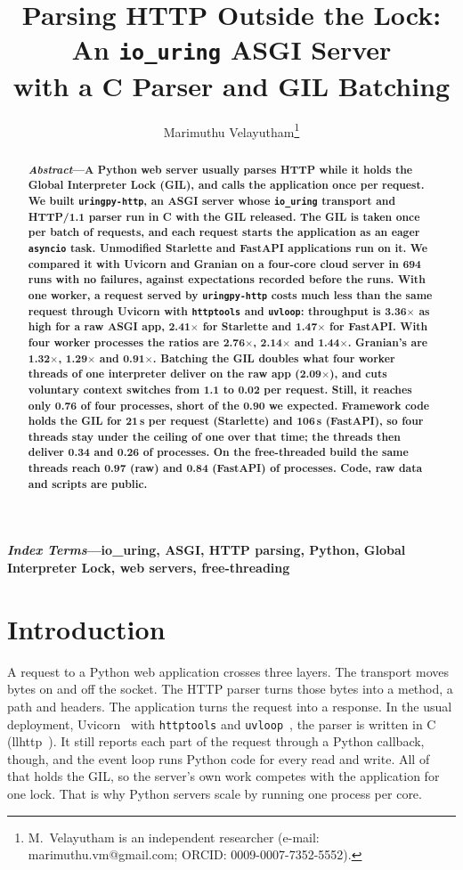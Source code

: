 \documentclass[10pt,twocolumn,letterpaper]{article}
\title{\LARGE Parsing HTTP Outside the Lock: An \texttt{io\_uring} ASGI Server\\ with a C Parser and GIL Batching}
\author{Marimuthu Velayutham\thanks{M.~Velayutham is an independent researcher
(e-mail: marimuthu.vm@gmail.com; ORCID: 0009-0007-7352-5552).}}
\date{}
\newcommand{\code}[1]{\texttt{#1}}
\newcommand{\kx}{$\times$}
\begin{document}
\maketitle

\begin{abstract}
\noindent\textbf{\textit{Abstract}---A Python web server usually parses
HTTP while it holds the Global Interpreter Lock (GIL), and calls the
application once per request. We built \code{uringpy-http}, an ASGI server
whose \code{io\_uring} transport and HTTP/1.1 parser run in C with the GIL
released. The GIL is taken once per batch of requests, and each request
starts the application as an eager \code{asyncio} task. Unmodified Starlette
and FastAPI applications run on it. We compared it with Uvicorn and Granian
on a four-core cloud server in 694 runs with no failures, against
expectations recorded before the runs. With one worker, a request served by
\code{uringpy-http} costs much less than the same request through Uvicorn
with \code{httptools} and \code{uvloop}: throughput is 3.36\kx{} as high for
a raw ASGI app, 2.41\kx{} for Starlette and 1.47\kx{} for FastAPI. With four
worker processes the ratios are 2.76\kx{}, 2.14\kx{} and 1.44\kx{}. Granian's
are 1.32\kx{}, 1.29\kx{} and 0.91\kx{}. Batching the GIL doubles what four
worker threads of one interpreter deliver on the raw app (2.09\kx{}), and
cuts voluntary context switches from 1.1 to 0.02 per request. Still, it
reaches only 0.76 of four processes, short of the 0.90 we expected. Framework
code holds the GIL for 21\,\textmu s per request (Starlette) and
106\,\textmu s (FastAPI), so four threads stay under the ceiling of one over
that time; the threads then deliver 0.34 and 0.26 of processes. On the
free-threaded build the same threads reach 0.97 (raw) and 0.84 (FastAPI) of
processes. Code, raw data and scripts are public.}
\end{abstract}

\noindent\textbf{\textit{Index Terms}---io\_uring, ASGI, HTTP parsing,
Python, Global Interpreter Lock, web servers, free-threading}

\section{Introduction}

A request to a Python web application crosses three layers. The transport
moves bytes on and off the socket. The HTTP parser turns those bytes into a
method, a path and headers. The application turns the request into a
response. In the usual deployment, Uvicorn~\cite{uvicorn} with
\code{httptools} and \code{uvloop}~\cite{uvloop}, the parser is written in C
(llhttp~\cite{llhttp}). It still reports each part of the request through a
Python callback, though, and the event loop runs Python code for every read
and write. All of that holds the GIL, so the server's own work competes with
the application for one lock. That is why Python servers scale by running
one process per core.
\end{document}
